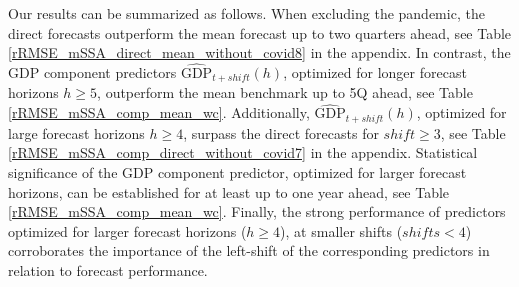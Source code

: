 \documentclass[11pt,a4paper]{article}
\begin{document}

Our results can be summarized as follows. When excluding the pandemic, the direct forecasts outperform the mean forecast up to two quarters ahead, see Table \ref{rRMSE_mSSA_direct_mean_without_covid8} in the appendix. %
In contrast, the GDP component predictors $\hat{\textrm{GDP}}_{t+shift}(h)$, optimized for longer forecast horizons $h\geq 5$, outperform the mean benchmark up to 5Q ahead, see Table \ref{rRMSE_mSSA_comp_mean_wc}. Additionally,  $\hat{\textrm{GDP}}_{t+shift}(h)$, optimized for large forecast horizons $h\geq 4$, surpass the direct forecasts for $shift\geq 3$, see Table \ref{rRMSE_mSSA_comp_direct_without_covid7} in the appendix. Statistical significance of the GDP component predictor, optimized for larger forecast horizons, can be established for at least up to one year ahead, see Table \ref{rRMSE_mSSA_comp_mean_wc}. Finally, the strong performance of predictors optimized for larger forecast horizons ($h\geq 4$), at smaller shifts ($shifts< 4$) corroborates the importance of the left-shift of the corresponding predictors in relation to forecast performance.  


\end{document}
